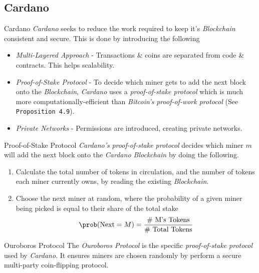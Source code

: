 \documentclass[11pt,a4paper]{article}
\begin{document}
\subsection*{Cardano}

  \begin{proposition}{Cardano}
    \textit{Cardano} seeks to reduce the work required to keep it's \textit{Blockchain} consistent and secure. This is done by introducing the following
    \begin{itemize}
      \item \textit{Multi-Layered Approach} - Transactions \& coins are separated from code \& contracts. This helps scalability.
      \item \textit{Proof-of-Stake Protocol} - To decide which miner gets to add the next block onto the \textit{Blockchain}, \textit{Cardano} uses a \textit{proof-of-stake protocol} which is much more computationally-efficient than \textit{Bitcoin's} \textit{proof-of-work protocol} (See \texttt{Proposition 4.9}).
      \item \textit{Private Networks} - Permissions are introduced, creating private networks.
    \end{itemize}
  \end{proposition}

  \begin{proposition}{Proof-of-Stake Protocol}
    \textit{Cardano's} \textit{proof-of-stake protocol} decides which miner $m$ will add the next block onto the \textit{Cardano Blockchain} by doing the following.
    \begin{enumerate}
      \item Calculate the total number of tokens in circulation, and the number of tokens each miner currently owns, by reading the existing \textit{Blockchain}.
      \item Choose the next miner at random, where the probability of a given miner being picked is equal to their share of the total stake
      \[ \prob(\text{Next}=M)=\frac{\text{\# M's Tokens}}{\text{\# Total Tokens}} \]
    \end{enumerate}
  \end{proposition}

  \begin{remark}{Ouroboros Protocol}
    The \textit{Ouroboros Protocol} is the specific \textit{proof-of-stake protocol} used by \textit{Cardano}. It ensures miners are chosen randomly by perform a secure multi-party coin-flipping protocol.
  \end{remark}
\end{document}
